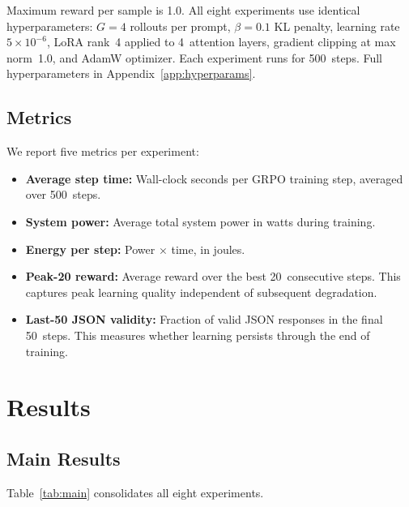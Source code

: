 \documentclass[11pt]{article}
\begin{document}
Maximum reward per sample is 1.0.  All eight experiments use identical hyperparameters: $G=4$ rollouts per prompt, $\beta=0.1$ KL penalty, learning rate $5\times10^{-6}$, LoRA rank~4 applied to 4~attention layers, gradient clipping at max norm~1.0, and AdamW optimizer.  Each experiment runs for 500~steps.  Full hyperparameters in Appendix~\ref{app:hyperparams}.

\subsection{Metrics}

We report five metrics per experiment:

\begin{itemize}[leftmargin=*]
\item \textbf{Average step time:}  Wall-clock seconds per GRPO training step, averaged over 500~steps.
\item \textbf{System power:}  Average total system power in watts during training.
\item \textbf{Energy per step:}  Power $\times$ time, in joules.
\item \textbf{Peak-20 reward:}  Average reward over the best 20~consecutive steps.  This captures peak learning quality independent of subsequent degradation.
\item \textbf{Last-50 JSON validity:}  Fraction of valid JSON responses in the final 50~steps.  This measures whether learning persists through the end of training.
\end{itemize}

\section{Results}
\label{sec:results}

\subsection{Main Results}
\label{sec:main_results}

Table~\ref{tab:main} consolidates all eight experiments.
\end{document}
